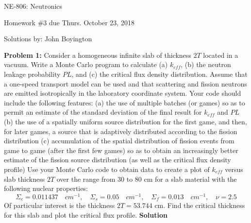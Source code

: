 \documentclass{amsart}
\theoremstyle{definition}
\begin{document}
\LARGE{NE-806: Neutronics}
 
\large
Homework \#3 due Thurs. October 23, 2018
 
Solutions by: John Boyington

\newline
\bigskip
 

\textbf{Problem 1:} Consider a homogeneous infinite slab of thickness $2T$ located in a vacuum. Write a
Monte Carlo program to calculate (a) $k_{eff}$, (b) the neutron leakage probability $PL$, and (c) the critical flux density distribution. Assume that a one-speed transport model can be used and that scattering and fission neutrons are emitted isotropically in the laboratory coordinate system.
\bigbreak
Your code should include the following features:
\bigbreak
(a) the use of multiple batches (or games) so as to permit an estimate of the standard deviation of the final result for $k_{eff}$ and $PL$\newline
\bigbreak
(b) the use of a spatially uniform source distribution for the first game, and then, for later games, a source that is adaptively distributed according to the fission distribution\newline
\bigbreak
(c) accumulation of the spatial distribution of fission events from game to game (after the first few games) so as to obtain an increasingly better estimate of the fission source distribution (as well as the critical flux density profile)\newline
\bigbreak
Use your Monte Carlo code to obtain data to create a plot of $k_{eff}$ versus slab thickness $2T$ over the range from 30 to 80 cm for a slab material with the following nuclear properties:
\bigbreak
\begin{equation*}
    \Sigma_c = 0.011437\quad cm^{-1}, \quad \Sigma_s = 0.05\quad cm^{-1}, \quad \Sigma_f = 0.013\quad cm^{-1}, \quad \nu=2.5
\end{equation*}
\bigbreak
Of particular interest is the thickness $2T = 53.744$ cm. Find the critical thickness for this slab and plot the critical flux profile.
\bigbreak
\textbf{Solution}
\end{document}

